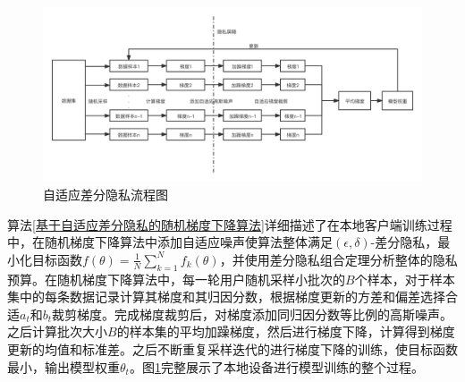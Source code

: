 \begin{figure}[!hbt]
\centering
	\includegraphics[scale=0.3]{fig2/C3/自适应差分隐私流程图}%
	\caption{自适应差分隐私流程图}
	\label{fig:自适应差分隐私流程图}	
\end{figure}

算法\ref{基于自适应差分隐私的随机梯度下降算法}详细描述了在本地客户端训练过程中，在随机梯度下降算法中添加自适应噪声使算法整体满足$(\epsilon, \delta)$-差分隐私，最小化目标函数$f(\theta)=\frac{1}{N} \sum_{k=1}^{N} f_{k}(\theta)$，并使用差分隐私组合定理分析整体的隐私预算。在随机梯度下降算法中，每一轮用户随机采样小批次的$B$个样本，对于样本集中的每条数据记录计算其梯度和其归因分数，根据梯度更新的方差和偏差选择合适$a_{t}$和$b_{t}$裁剪梯度。完成梯度裁剪后，对梯度添加同归因分数等比例的高斯噪声。之后计算批次大小$B$的样本集的平均加躁梯度，然后进行梯度下降，计算得到梯度更新的均值和标准差。之后不断重复采样迭代的进行梯度下降的训练，使目标函数最小，输出模型权重$\theta_{t}$。图\ref{fig:自适应差分隐私流程图}完整展示了本地设备进行模型训练的整个过程。

